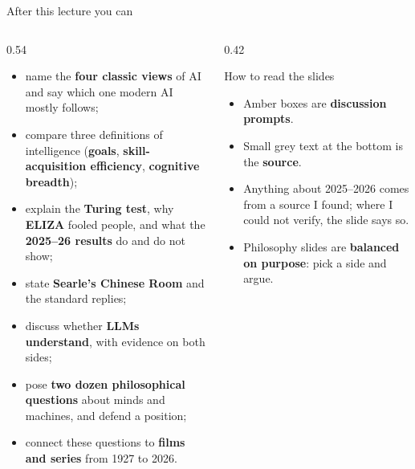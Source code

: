 \documentclass[aspectratio=169,10pt]{beamer}
\begin{document}
\begin{frame}{After this lecture you can}
\begin{columns}[T]
\begin{column}{0.54\textwidth}
\begin{itemize}\setlength\itemsep{4pt}\small
\item name the \textbf{four classic views} of AI and say which one modern AI mostly follows;
\item compare three definitions of intelligence (\textbf{goals}, \textbf{skill-acquisition efficiency}, \textbf{cognitive breadth});
\item explain the \textbf{Turing test}, why \textbf{ELIZA} fooled people, and what the \textbf{2025--26 results} do and do not show;
\item state \textbf{Searle's Chinese Room} and the standard replies;
\item discuss whether \textbf{LLMs understand}, with evidence on both sides;
\item pose \textbf{two dozen philosophical questions} about minds and machines, and defend a position;
\item connect these questions to \textbf{films and series} from 1927 to 2026.
\end{itemize}
\end{column}
\begin{column}{0.42\textwidth}
\begin{block}{How to read the slides}
{\small
\begin{itemize}\setlength\itemsep{2pt}
\item Amber boxes are \textbf{discussion prompts}.
\item Small grey text at the bottom is the \textbf{source}.
\item Anything about 2025--2026 comes from a source I found; where I could not verify, the slide says so.
\item Philosophy slides are \textbf{balanced on purpose}: pick a side and argue.
\end{itemize}}
\end{block}
\end{column}
\end{columns}
\end{frame}











\end{document}
